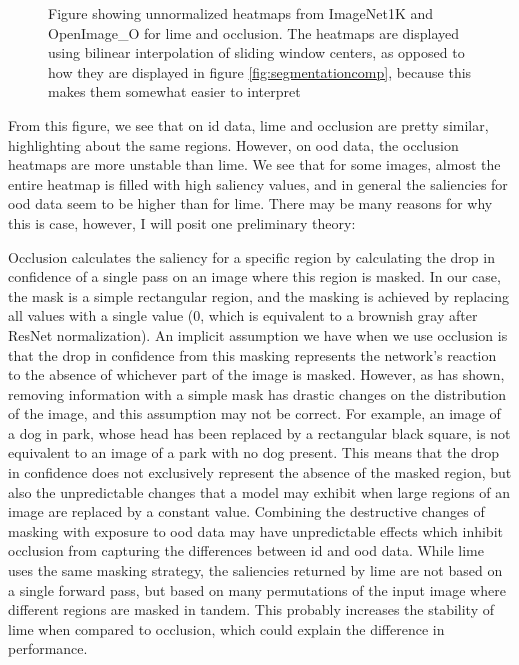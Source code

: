\documentclass[UKenglish]{uiomasterthesis} %
\theoremstyle{definition}
\begin{document}
\begin{figure}[hbtp]
\begin{center}
        \caption[LIME and Occlusion heatmap comparison]{Figure showing unnormalized heatmaps from ImageNet1K and OpenImage\_O for \ac{lime} and occlusion. The heatmaps are displayed using bilinear interpolation of sliding window centers, as opposed to how they are displayed in figure \ref{fig:segmentationcomp}, because this makes them somewhat easier to interpret}
    \label{fig:lime_occ_comp}
    \end{center}
\end{figure}

From this figure, we see that on \ac{id} data, \ac{lime} and occlusion are pretty similar, highlighting about the same regions. However, on \ac{ood} data, the occlusion heatmaps are more unstable than \ac{lime}. We see that for some images, almost the entire heatmap is filled with high saliency values, and in general the saliencies for \ac{ood} data seem to be higher than for \ac{lime}. There may be many reasons for why this is case, however, I will posit one preliminary theory: 

Occlusion calculates the saliency for a specific region by calculating the drop in confidence of a single pass on an image where this region is masked. In our case, the mask is a simple rectangular region, and the masking is achieved by replacing all values with a single value (0, which is equivalent to a brownish gray after ResNet normalization). An implicit assumption we have when we use occlusion is that the drop in confidence from this masking represents the network's reaction to the absence of whichever part of the image is masked. However, as \cite{roar} has shown, removing information with a simple mask has drastic changes on the distribution of the image, and this assumption may not be correct. For example, an image of a dog in park, whose head has been replaced by a rectangular black square, is not equivalent to an image of a park with no dog present. This means that the drop in confidence does not exclusively represent the absence of the masked region, but also the unpredictable changes that a model may exhibit when large regions of an image are replaced by a constant value. Combining the destructive changes of masking with exposure to \ac{ood} data may have unpredictable effects which inhibit occlusion from capturing the differences between \ac{id} and \ac{ood} data. While \ac{lime} uses the same masking strategy, the saliencies returned by \ac{lime} are not based on a single forward pass, but based on many permutations of the input image where different regions are masked in tandem. This probably increases the stability of \ac{lime} when compared to occlusion, which could explain the difference in performance.
\end{document}
